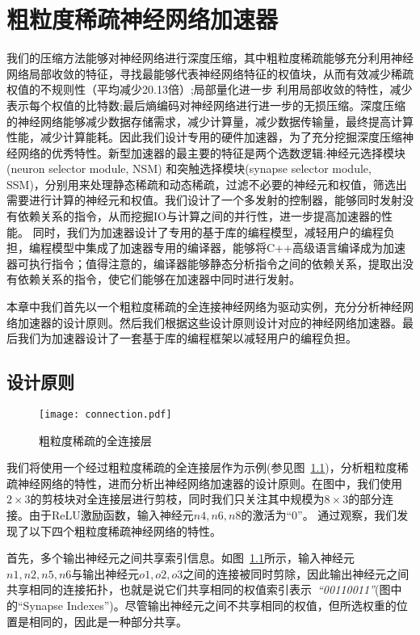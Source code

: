 \chapter{粗粒度稀疏神经网络加速器}

我们的压缩方法能够对神经网络进行深度压缩，其中粗粒度稀疏能够充分利用神经网络局部收敛的特征，寻找最能够代表神经网络特征的权值块，从而有效减少稀疏权值的不规则性（平均减少20.13倍）;局部量化进一步
利用局部收敛的特性，减少表示每个权值的比特数;最后熵编码对神经网络进行进一步的无损压缩。深度压缩的神经网络能够减少数据存储需求，减少计算量，减少数据传输量，最终提高计算性能，减少计算能耗。因此我们设计专用的硬件加速器，为了充分挖掘深度压缩神经网络的优秀特性。新型加速器的最主要的特征是两个选数逻辑:神经元选择模块 (neuron selector module, NSM) 和突触选择模块(synapse selector module, SSM)，分别用来处理静态稀疏和动态稀疏，过滤不必要的神经元和权值，筛选出需要进行计算的神经元和权值。我们设计了一个多发射的控制器，能够同时发射没有依赖关系的指令，从而挖掘IO与计算之间的并行性，进一步提高加速器的性能。
同时，我们为加速器设计了专用的基于库的编程模型，减轻用户的编程负担，编程模型中集成了加速器专用的编译器，能够将C++高级语言编译成为加速器可执行指令；值得注意的，编译器能够静态分析指令之间的依赖关系，提取出没有依赖关系的指令，使它们能够在加速器中同时进行发射。

本章中我们首先以一个粗粒度稀疏的全连接神经网络为驱动实例，充分分析神经网络加速器的设计原则。然后我们根据这些设计原则设计对应的神经网络加速器。最后我们为加速器设计了一套基于库的编程框架以减轻用户的编程负担。

\section{设计原则}
\label{sec:principle}

\begin{figure}[ht]
\centering
\texttt{[image: connection.pdf]}
\caption{粗粒度稀疏的全连接层}
\label{fig:connection}
\end{figure}

我们将使用一个经过粗粒度稀疏的全连接层作为示例(参见图~\ref{fig:connection})，分析粗粒度稀疏神经网络的特性，进而分析出神经网络加速器的设计原则。在图中，我们使用$2\times 3$的剪枝块对全连接层进行剪枝，同时我们只关注其中规模为$8\times 3$的部分连接。由于ReLU激励函数，输入神经元$n4, n6, n8$的激活为“0”。
通过观察，我们发现了以下四个粗粒度稀疏神经网络的特性。

首先，多个输出神经元之间共享索引信息。如图~\ref{fig:connection}所示，输入神经元$n1, n2, n5, n6$与输出神经元$o1, o2, o3$之间的连接被同时剪除，因此输出神经元之间共享相同的连接拓扑，也就是说它们共享相同的权值索引表示~\emph{“00110011”}(图中的“Synapse Indexes”)。尽管输出神经元之间不共享相同的权值，但所选权重的位置是相同的，因此是一种部分共享。

